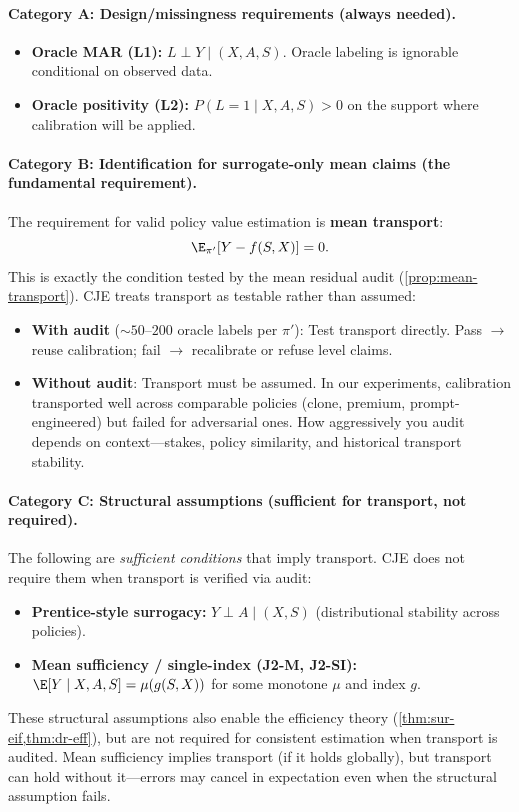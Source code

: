 \paragraph{Category A: Design/missingness requirements (always needed).}
\begin{itemize}[leftmargin=*,nosep]
\item \textbf{Oracle MAR (L1):} $L \perp Y \mid (X, A, S)$. Oracle labeling is ignorable conditional on observed data.
\item \textbf{Oracle positivity (L2):} $P(L=1 \mid X, A, S) > 0$ on the support where calibration will be applied.
\end{itemize}

\paragraph{Category B: Identification for surrogate-only mean claims (the fundamental requirement).}
The requirement for valid policy value estimation is \textbf{mean transport}:
\[
\E_{\pi'}[Y - f(S,X)] = 0.
\]
This is exactly the condition tested by the mean residual audit (\cref{prop:mean-transport}). CJE treats transport as testable rather than assumed:
\begin{itemize}[leftmargin=*,nosep]
\item \textbf{With audit} (${\sim}50$--$200$ oracle labels per $\pi'$): Test transport directly. Pass $\to$ reuse calibration; fail $\to$ recalibrate or refuse level claims.
\item \textbf{Without audit}: Transport must be assumed. In our experiments, calibration transported well across comparable policies (clone, premium, prompt-engineered) but failed for adversarial ones. How aggressively you audit depends on context---stakes, policy similarity, and historical transport stability.
\end{itemize}

\paragraph{Category C: Structural assumptions (sufficient for transport, not required).}
The following are \emph{sufficient conditions} that imply transport. CJE does not require them when transport is verified via audit:
\begin{itemize}[leftmargin=*,nosep]
\item \textbf{Prentice-style surrogacy:} $Y \perp A \mid (X, S)$ (distributional stability across policies).
\item \textbf{Mean sufficiency / single-index (J2-M, J2-SI):} $\E[Y \mid X, A, S] = \mu(g(S,X))$ for some monotone $\mu$ and index $g$.
\end{itemize}
These structural assumptions also enable the efficiency theory (\cref{thm:sur-eif,thm:dr-eff}), but are not required for consistent estimation when transport is audited. Mean sufficiency implies transport (if it holds globally), but transport can hold without it---errors may cancel in expectation even when the structural assumption fails.

